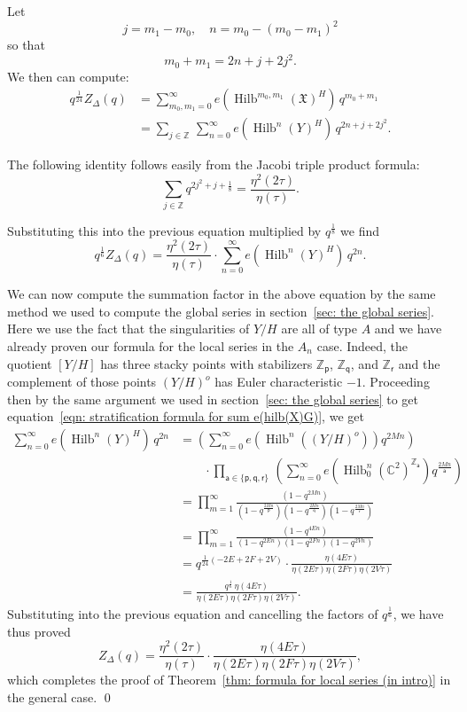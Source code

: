 \documentclass{amsart}
\theoremstyle{definition}
\newcommand{\CC} {{\mathbb C}}          %
\newcommand{\ZZ} {{\mathbb Z}}		%
\newcommand{\X}{\mathfrak{X}}
\newcommand{\varp}{\mathsf{p}}
\newcommand{\varq}{\mathsf{q}}
\newcommand{\varr}{\mathsf{r}}
\newcommand{\vara}{\mathsf{a}}
\newcommand{\Hilb}{\operatorname{Hilb}}
\begin{document}
Let
\[
j=m_{1}-m_{0}, \quad n=m_{0}-(m_{0}-m_{1})^{2} 
\]
so that
\[
m_{0}+m_{1} = 2n +j + 2j^{2}. 
\]
We then can compute:
\begin{align*}
q^{\frac{1}{24}} Z_{\Delta}(q) &= \sum_{m_{0},m_{1}= 0}^{\infty } 
e\left(\Hilb^{m_{0},m_{1}}(\X )^{H} \right) \, q^{m_{0}+m_{1}} \\
&= \sum_{j\in \ZZ}\,  \sum_{n=0}^{\infty} e\left(\Hilb^{n}(Y)^{H}
\right)\, q^{2n+j+2j^{2}}.
\end{align*}

The following identity follows easily from the Jacobi triple product
formula:
\[
\sum_{j\in \ZZ} q^{2j^{2}+j+\frac{1}{8}} = \frac{\eta^{2}(2\tau )}{\eta (\tau )}.
\]

Substituting this into the previous equation multiplied by
$q^{\frac{1}{8}}$ we find
\[
q^{\frac{1}{6}} Z_{\Delta}(q) =  \frac{\eta^{2}(2\tau )}{\eta (\tau )} \cdot
\sum_{n=0}^{\infty}  e\left(\Hilb^{n}(Y)^{H}
\right)\, q^{2n}.
\]

We can now compute the summation factor in the above equation by the
same method we used to compute the global series in section~\ref{sec:
the global series}. Here we use the fact that the singularities of
$Y/H$ are all of type $A$ and we have already proven our formula for
the local series in the $A_{n}$ case. Indeed, the quotient $[Y/H]$ has
three stacky points with stabilizers $\ZZ_{\varp}$, $\ZZ_{\varq}$, and
$\ZZ_{\varr}$ and the complement of those points $(Y/H)^{o}$ has Euler
characteristic $-1$. Proceeding then by the same argument we used in
section~\ref{sec: the global series} to get equation~\eqref{eqn:
stratification formula for sum e(hilb(X)G)}, we get
\begin{align*}
\sum_{n=0}^{\infty}  e\left(\Hilb^{n}(Y)^{H}\right)\, q^{2n}&=
\left(\sum_{n=0}^{\infty} e\left(\Hilb^{n}\left((Y/H)^{o} \right)
\right) q^{2Mn} \right)  \\
&\quad \quad  \cdot \prod_{\vara \in \{\varp ,\varq
,\varr  \}}\, \left( \sum_{n=0}^{\infty} e\left(\Hilb_{0}^{n}(\CC^{2})^{\ZZ_{\vara }} \right) q^{\frac{2Mn}{\vara }}  \right)\\
&=\prod_{m=1}^{\infty} \frac{\left(1-q^{2Mn} \right)}{\left(1-q^{\frac{2Mn}{\varp}} \right)\left(1-q^{\frac{2Mn}{\varq}} \right)\left(1-q^{\frac{2Mn}{\varr}} \right)}\\
&=\prod_{m=1}^{\infty} \frac{\left(1-q^{4En} \right)}{\left(1-q^{2En} \right)\left(1-q^{2Fn} \right)\left(1-q^{2Vn} \right)}\\
&=q^{\frac{1}{24}(-2E+2F+2V)}\cdot  \frac{\eta (4E\tau )}{\eta (2E\tau )\eta
(2F\tau )\eta (2V\tau )} \\
&=  \frac{q^{\frac{1}{6}}\,\eta (4E\tau )}{\eta (2E\tau )\eta
(2F\tau )\eta (2V\tau )}.
\end{align*}
Substituting into the previous equation and cancelling the factors of
$q^{\frac{1}{6}}$, we have thus proved
\[
Z_{\Delta}(q) =  \frac{\eta^{2}(2\tau )}{\eta (\tau )}\cdot \frac{\eta (4E\tau )}{\eta
(2E\tau )\eta (2F\tau )\eta (2V\tau )},
\]
which completes the proof of Theorem~\ref{thm: formula for local
series (in intro)} in the general case. \qed
\end{document}
